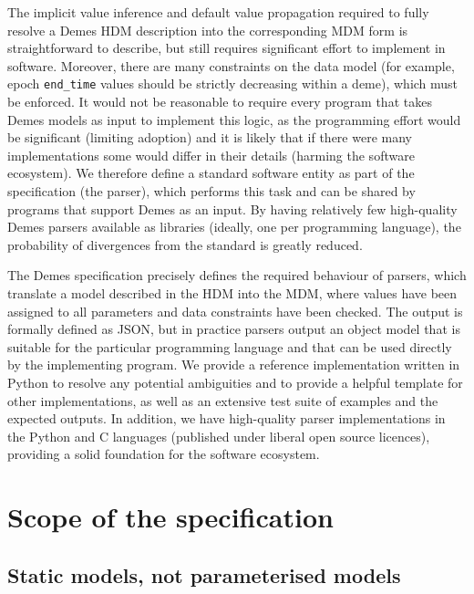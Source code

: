 \documentclass[11pt]{article}
\begin{document}
The implicit value inference and default value propagation required to
fully resolve a Demes HDM description into the corresponding
MDM form is straightforward
to describe, but still requires significant effort to implement in
software. Moreover, there are many constraints on the data model
(for example, epoch \texttt{end\_time} values should be strictly decreasing
within a deme), which must be enforced.
It would not be reasonable to require every program that
takes Demes models as input to implement this logic, as the programming
effort would be significant (limiting adoption)
and it is likely that if there were many implementations some would differ
in their details (harming the software ecosystem).
We therefore define
a standard software entity as part of the specification (the parser),
which performs this task and can be shared by programs that
support Demes as an input. By having relatively few high-quality Demes
parsers available as libraries (ideally, one per programming language),
the probability of divergences from the standard is greatly reduced.

The Demes specification precisely defines the required behaviour of parsers,
which translate a model described in the HDM into the MDM, where values have been
assigned to all parameters and data
constraints have been checked. The output is formally defined as JSON, but in
practice parsers output an object model that is suitable for the particular
programming language and that can be used directly by the implementing program.
We provide a reference implementation written in Python to resolve any
potential ambiguities and to provide a helpful template for other
implementations, as well as an extensive test suite of examples and the
expected outputs. In addition, we have high-quality parser implementations in
the Python and C languages (published under liberal open source licences),
providing a solid foundation for the software ecosystem.

\section{Scope of the specification}
\label{sec:appendix-scope}

\subsection{Static models, not parameterised models}
\label{sec:appendix-static}
\end{document}
